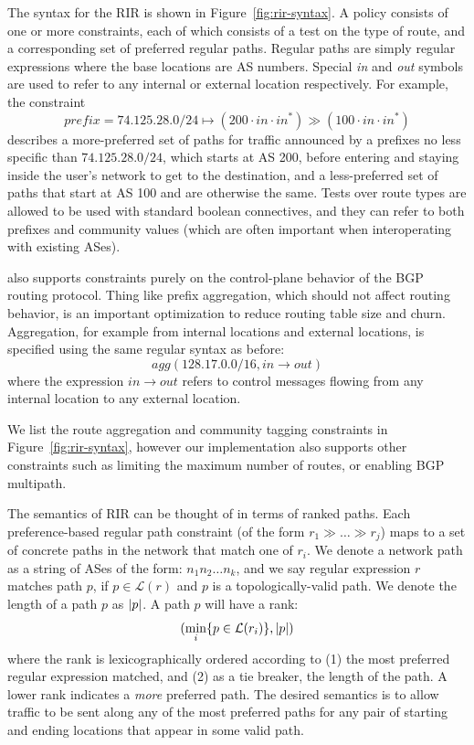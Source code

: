 
The syntax for the RIR is shown in Figure~\ref{fig:rir-syntax}. A policy consists of one or more constraints, each of which consists of a test on the type of route, and a corresponding set of preferred regular paths. Regular paths are simply regular expressions where the base locations are AS numbers. Special \textit{in} and \textit{out} symbols are used to refer to any internal or external location respectively.
For example, the constraint 
$$prefix=74.125.28.0/24 \mapsto (200 \cdot in \cdot in^*) \gg (100 \cdot in \cdot in^*)$$
describes a more-preferred set of paths for traffic announced by a prefixes no less specific than $74.125.28.0/24$, which starts at AS 200, before entering and staying inside the user's network to get to the destination, and a less-preferred set of paths that start at AS 100 and are otherwise the same. Tests over route types are allowed to be used with standard boolean connectives, and they can refer to both prefixes and community values (which are often important when interoperating with existing ASes).

\sysname also supports constraints purely on the control-plane behavior of the BGP routing protocol. Thing like prefix aggregation, which should not affect routing behavior, is an important optimization to reduce routing table size and churn. Aggregation, for example from internal locations and external locations, is specified using the same regular syntax as before: 
$$agg(128.17.0.0/16, in \rightarrow out)$$
where the expression $in \rightarrow out$ refers to control messages flowing from any internal location to any external location.

We list the route aggregation and community tagging constraints in Figure~\ref{fig:rir-syntax}, however our implementation also supports other constraints such as limiting the maximum number of routes, or enabling BGP multipath.



The semantics of RIR can be thought of in terms of ranked paths. Each preference-based regular path constraint (of the form $r_1 \gg \dots \gg r_j$) maps to a set of concrete paths in the network that match one of $r_i$. We denote a network path as a string of ASes of the form: $n_1 n_2 \dots n_k$, and we say regular expression $r$ matches path $p$, if $p \in \mathcal{L}(r)$ and $p$ is a topologically-valid path. We denote the length of a path $p$ as $ \lvert p \rvert $. A path $p$ will have a rank: 
$$(\min_i \{  p \in \mathcal{L}(r_i)  \} ,  \lvert p \rvert )$$
where the rank is lexicographically ordered according to (1) the most preferred regular expression matched, and (2) as a tie breaker, the length of the path. A lower rank indicates a \emph{more} preferred path. The desired semantics is to allow traffic to be sent along any of the most preferred paths for any pair of starting and ending locations that appear in some valid path. 

